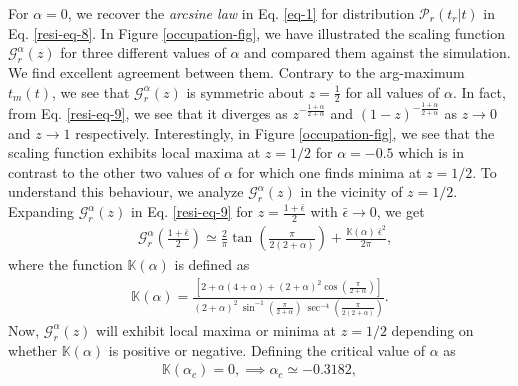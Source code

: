 \documentclass[showpacs,amsmath,amssymb,aps,pre,twocolumn,]{revtex4-1}
\begin{document}
For $\alpha =0$, we recover the \textit{arcsine law} in Eq. \eqref{eq-1} for distribution $\mathcal{P}_r(t_r|t)$ in Eq. \eqref{resi-eq-8}. In Figure \ref{occupation-fig}, we have illustrated the scaling function $\mathcal{G} _{r}^{\alpha} \left( z \right)$ for three different values of $\alpha$ and compared them against the simulation. We find excellent agreement between them. Contrary to the arg-maximum $t_m(t)$, we see that $\mathcal{G} _{r}^{\alpha} \left( z \right)$ is symmetric about $z = \frac{1}{2}$ for all values of $\alpha$. In fact, from Eq. \eqref{resi-eq-9}, we see that it diverges as $z^{-\frac{1+\alpha}{2+\alpha}}$ and $(1-z)^{-\frac{1+\alpha}{2+\alpha}}$ as $z \to 0$ and $z \to 1$ respectively. Interestingly, in Figure \ref{occupation-fig}, we see that the scaling function exhibits local maxima at $z=1/2$ for $\alpha =-0.5$ which is in contrast to the other two values of $\alpha$ for which one finds minima at $z=1/2$. To understand this behaviour, we analyze $\mathcal{G} _{r}^{\alpha} \left( z \right)$ in the vicinity of $z = 1/2$. Expanding $\mathcal{G} _{r}^{\alpha} \left( z \right)$ in Eq. \eqref{resi-eq-9} for $z = \frac{1+ \bar{\epsilon}}{2}$ with $\bar{\epsilon} \to 0 $, we get
\begin{align}
& \mathcal{G} _{r}^{\alpha} \left( \frac{1+ \bar{\epsilon}}{2} \right) \simeq \frac{2}{\pi} \tan \left( \frac{\pi}{2(2+\alpha)}\right) +\frac{\mathbb{K}(\alpha)~ \bar{\epsilon} ^2}{2 \pi}, \label{resi-eq-10} 
\end{align}
 where the function $\mathbb{K}(\alpha)$ is defined as
\begin{align}
\mathbb{K}(\alpha) = \frac{\left[ 2+\alpha (4+\alpha) + (2+\alpha)^2 \cos \left( \frac{\pi}{2+\alpha}\right) \right]}{(2+\alpha)^2~\sin ^{-1}\left( \frac{\pi}{2+\alpha}\right)~\sec ^{-4} \left( \frac{\pi}{2(2+\alpha)}\right)}. 
\label{resi-eq-11}
 \end{align}
Now, $\mathcal{G} _{r}^{\alpha}(z) $ will exhibit local maxima or minima at $z = 1/2$ depending on whether $\mathbb{K}(\alpha)$ is positive or negative. Defining the critical value of $ \alpha $ as
\begin{align}
 \mathbb{K}(\alpha _c) = 0, \implies \alpha _c \simeq -0.3182,
\label{resi-eq-11}
\end{align}
\end{document}
